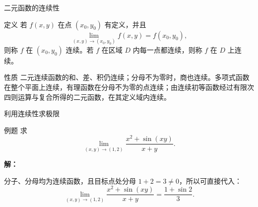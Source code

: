 \documentclass[aspectratio=169,10pt]{ctexbeamer}
\begin{document}
\begin{frame}{二元函数的连续性}
	
	\begin{block}{定义}
			若 \(f(x,y)\) 在点 \((x_0,y_0)\) 有定义，并且
		\[
		\lim\limits_{(x,y)\to(x_0,y_0)}f(x,y)=f(x_0,y_0),
		\]
		则称 \(f\) 在 \((x_0,y_0)\) 连续。若 \(f\) 在区域 \(D\) 内每一点都连续，则称 \(f\) 在 \(D\) 上连续。
	\end{block}
	
	\begin{block}{性质}
		二元连续函数的和、差、积仍连续；分母不为零时，商也连续。多项式函数在整个平面上连续，有理函数在分母不为零的点连续；由连续初等函数经过有限次四则运算与复合所得的二元函数，在其定义域内连续。
	\end{block}
\end{frame}



\begin{frame}{利用连续性求极限}
	\small
	\begin{block}{例题}
			求
		\[
		\lim\limits_{(x,y)\to(1,2)}
		\frac{x^2+\sin(xy)}{x+y}.
		\]
		
	\end{block}
	
	\pause
	
	\vspace{0.5cm}
	
	\textbf{解：}
	
	分子、分母均为连续函数，且目标点处分母 \(1+2=3\neq0\)，所以可直接代入：
	\[
	\lim\limits_{(x,y)\to(1,2)}
	\frac{x^2+\sin(xy)}{x+y}
	=\frac{1+\sin2}{3}.
	\]
	
\end{frame}
\end{document}

